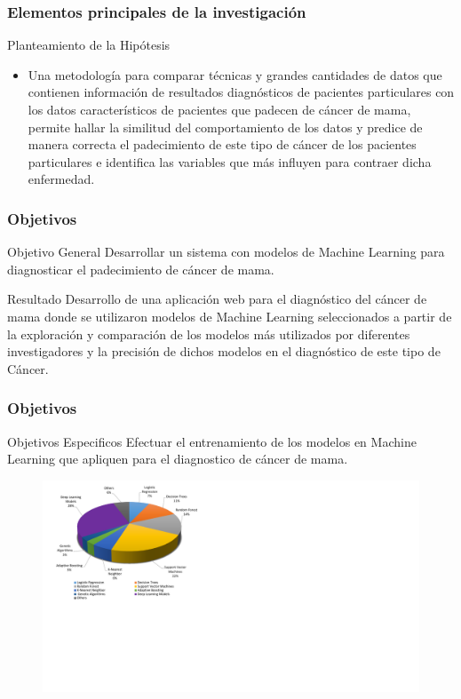 \documentclass[xcolor=dvipsnames,xcolor=table]{beamer} %
\begin{document}
\begin{frame}
	\frametitle{Elementos principales de la investigación}
	\begin{block}{Planteamiento de la Hipótesis} \justifying
	\begin{itemize}
		\item Una metodología para comparar técnicas y grandes cantidades de datos que contienen información de resultados diagnósticos de pacientes particulares con los datos característicos de pacientes que padecen de cáncer de mama, permite hallar la similitud del comportamiento de los datos y predice de manera correcta el padecimiento de este tipo de cáncer de los pacientes particulares e identifica las variables que más influyen para contraer dicha enfermedad. 
	\end{itemize}

	\end{block}
\end{frame}
\begin{frame}
	\frametitle{Objetivos}
	\begin{block}{Objetivo General}
		\justifying		
		Desarrollar un sistema con modelos de Machine Learning para diagnosticar el padecimiento de cáncer de mama.
	\end{block}
	
	\begin{alertblock}{Resultado}
		\justifying	
		Desarrollo de una aplicación web para el diagnóstico del cáncer de mama donde se utilizaron modelos de Machine Learning seleccionados a partir de la exploración y comparación de los modelos más utilizados por diferentes investigadores y la precisión de dichos modelos  en el diagnóstico de este tipo de Cáncer. 
	\end{alertblock}

\end{frame}

\begin{frame}
	\frametitle{Objetivos}
	\begin{block}{Objetivos Especificos}\justifying
		Efectuar el entrenamiento de los modelos en Machine Learning que apliquen para el diagnostico de cáncer de mama.	
	\end{block}
	\begin{figure}[h!]
	\centering
	\includegraphics[width=0.55\linewidth]{PROYECTO/imgs/ModelosUsados}
	\end{figure}
\end{frame}
\end{document}
